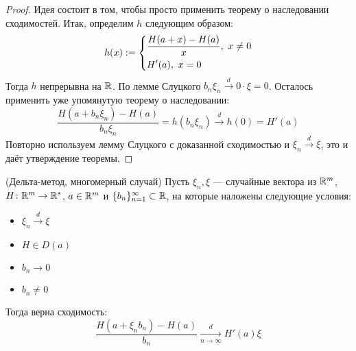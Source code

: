 \begin{proof}
	Идея состоит в том, чтобы просто применить теорему о наследовании сходимостей. Итак, определим $h$ следующим образом:
	\[
		h(x) := \left\{\begin{aligned}
			&{\frac{H(a + x) - H(a)}{x},\ x \neq 0}
			\\
			&{H'(a),\ x = 0}
		\end{aligned}\right.
	\]
	Тогда $h$ непрерывна на $\mathbb{R}$. По лемме Слуцкого $b_n\xi_n \xrightarrow{d} 0 \cdot \xi = 0$. Осталось применить уже упомянутую теорему о наследовании:
	\[
		\frac{H(a + b_n\xi_n) - H(a)}{b_n\xi_n} = h(b_n\xi_n) \xrightarrow{d} h(0) = H'(a)
	\]
	Повторно используем лемму Слуцкого с доказанной сходимостью и $\xi_n \xrightarrow{d} \xi$, это и даёт утверждение теоремы.
\end{proof}

\begin{theorem} (Дельта-метод, многомерный случай)
	Пусть $\xi_n, \xi$ --- случайные вектора из $\mathbb{R}^m$, $H \colon \mathbb{R}^m \to \mathbb{R}^s$, $a \in \mathbb{R}^m$ и $\{b_n\}_{n = 1}^\infty \subset \mathbb{R}$, на которые наложены следующие условия:
	\begin{itemize}
		\item $\xi_n \xrightarrow{d} \xi$
		
		\item $H \in D(a)$
		
		\item $b_n \to 0$
		
		\item $b_n \neq 0$
	\end{itemize}
	Тогда верна сходимость:
	\[
		\frac{H(a + \xi_nb_n) - H(a)}{b_n} \xrightarrow[n \to \infty]{d} H'(a)\xi
	\]
\end{theorem}